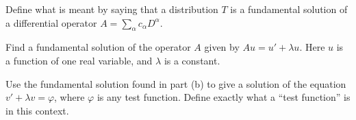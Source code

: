 \begin{alist}
\item Define what is meant by saying that a distribution $T$ is a
fundamental solution of a differential operator
$A=\sum_{\alpha}c_{\alpha} D^{\alpha}$.
\item Find a fundamental solution of the operator $A$ given by
$Au=u'+\lambda u$. Here $u$ is a function of one real variable, and
$\lambda$ is a constant.
\item Use the fundamental solution found in part (b) to give a solution
of the equation $v'+\lambda v=\varphi$, where $\varphi$ is any test
function. Define exactly what a ``test function'' is in this context.
\end{alist}
